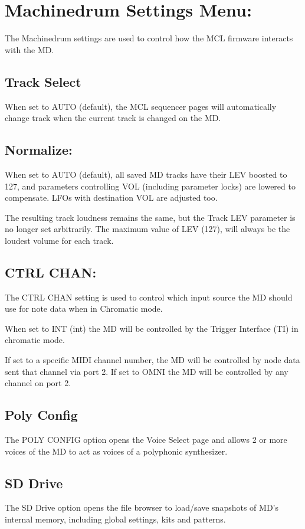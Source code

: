 \chapter{Machinedrum Settings Menu:}
The Machinedrum settings are used to control how the MCL firmware interacts with the MD.
\section{Track Select}
When set to AUTO (default), the MCL sequencer pages will automatically change track when the current track is changed on the MD.

\section{Normalize:}
When set to AUTO (default), all saved MD tracks have their LEV boosted to 127, and parameters controlling VOL (including parameter locks) are lowered
to compensate. LFOs with destination VOL are 
adjusted too.

The resulting track loudness remains the same, but the Track LEV parameter is no longer set arbitrarily. The maximum value of LEV (127), will always be the loudest volume for each track.
\section{CTRL CHAN:}
The CTRL CHAN setting is used to control which input  source the MD should use for note data when in Chromatic mode.

When set to INT (int) the MD will be controlled by the Trigger Interface (TI) in chromatic mode.

If set to a specific MIDI channel number, the MD will be controlled by node data sent that channel via port 2. If set to OMNI the MD will be controlled by any channel on port 2.
\section{Poly Config}
The POLY CONFIG option opens the Voice Select page and allows 2 or more voices of the MD to act as voices of a polyphonic synthesizer.
\section{SD Drive}
The SD Drive option opens the file browser to load/save snapshots of MD's internal memory, including global settings, kits and patterns.